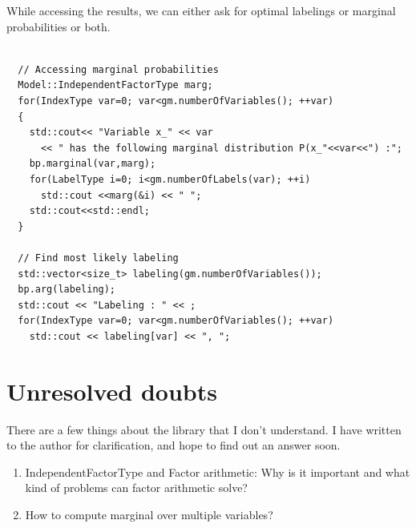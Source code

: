 \documentclass[12pt,oneside,letterpaper]{article}
\begin{document}
While accessing the results, we can either ask for optimal labelings or marginal probabilities or both.

\begin{lstlisting}

  // Accessing marginal probabilities
  Model::IndependentFactorType marg;
  for(IndexType var=0; var<gm.numberOfVariables(); ++var)
  {
    std::cout<< "Variable x_" << var 
      << " has the following marginal distribution P(x_"<<var<<") :";
    bp.marginal(var,marg);
    for(LabelType i=0; i<gm.numberOfLabels(var); ++i)
      std::cout <<marg(&i) << " ";
    std::cout<<std::endl;
  }   

  // Find most likely labeling
  std::vector<size_t> labeling(gm.numberOfVariables());
  bp.arg(labeling);
  std::cout << "Labeling : " << ;
  for(IndexType var=0; var<gm.numberOfVariables(); ++var)
    std::cout << labeling[var] << ", ";
\end{lstlisting}

\section{Unresolved doubts}
There are a few things about the library that I don't understand. I have
written to the author for clarification, and hope to find out an answer soon.

\begin{enumerate}
  \item IndependentFactorType and Factor arithmetic: Why is it important and what kind of problems can factor arithmetic solve?
  \item How to compute marginal over multiple variables?
\end{enumerate}
\end{document}
